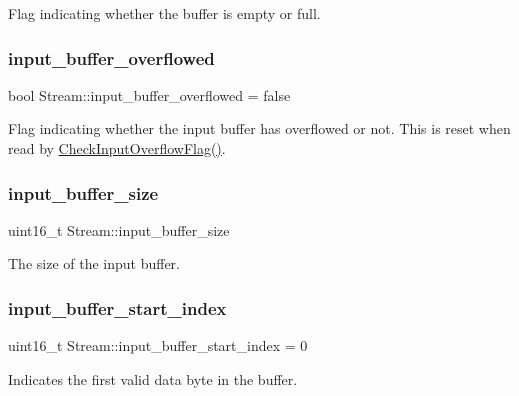 Flag indicating whether the buffer is empty or full. \hypertarget{class_stream_ae7300cb8941cec142c14e8fc9baab9d3}{}\label{class_stream_ae7300cb8941cec142c14e8fc9baab9d3} 
\subsubsection{\texorpdfstring{input\+\_\+buffer\+\_\+overflowed}{input\_buffer\_overflowed}}
{\footnotesize\ttfamily bool Stream\+::input\+\_\+buffer\+\_\+overflowed = false\hspace{0.3cm}{\ttfamily [protected]}}

Flag indicating whether the input buffer has overflowed or not. This is reset when read by \hyperlink{class_stream_a088c4e68d568acfad715c56f408fe9f8}{Check\+Input\+Overflow\+Flag()}. \hypertarget{class_stream_a7373b1d6580a2d5dc74e788b3bb6a596}{}\label{class_stream_a7373b1d6580a2d5dc74e788b3bb6a596} 
\subsubsection{\texorpdfstring{input\+\_\+buffer\+\_\+size}{input\_buffer\_size}}
{\footnotesize\ttfamily uint16\+\_\+t Stream\+::input\+\_\+buffer\+\_\+size\hspace{0.3cm}{\ttfamily [protected]}}

The size of the input buffer. \hypertarget{class_stream_a6fc009e9e71fa92cbbf9b407ede82a73}{}\label{class_stream_a6fc009e9e71fa92cbbf9b407ede82a73} 
\subsubsection{\texorpdfstring{input\+\_\+buffer\+\_\+start\+\_\+index}{input\_buffer\_start\_index}}
{\footnotesize\ttfamily uint16\+\_\+t Stream\+::input\+\_\+buffer\+\_\+start\+\_\+index = 0\hspace{0.3cm}{\ttfamily [protected]}}

Indicates the first valid data byte in the buffer. \hypertarget{class_stream_aaceece6a2defd1f7d9667fcc0be03a7a}{}\label{class_stream_aaceece6a2defd1f7d9667fcc0be03a7a} 
